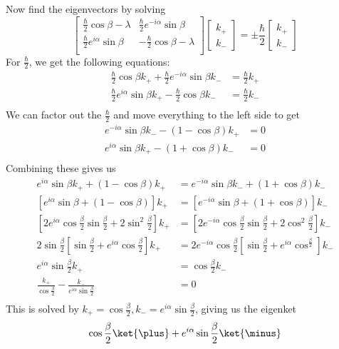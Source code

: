 Now find the eigenvectors by solving
\[
\begin{bmatrix}
  \frac{\hbar}{2}\cos\beta - \lambda & \frac{\hbar}{2}e^{-i\alpha}\sin\beta \\
  \frac{\hbar}{2}e^{i\alpha}\sin\beta & -\frac{\hbar}{2}\cos\beta - \lambda \\
\end{bmatrix}
\begin{bmatrix}
  k_{\plus} \\
  k_{\minus}
\end{bmatrix}
=
\pm\frac{\hbar}{2}
\begin{bmatrix}
  k_{\plus} \\
  k_{\minus}
\end{bmatrix}
\]
For $\frac{\hbar}{2}$, we get the
following equations:
\begin{align*}
  \frac{\hbar}{2}\cos\beta k_{\plus}
  +\frac{\hbar}{2}e^{-i\alpha}\sin\beta k_{\minus} &=
  \frac{\hbar}{2}k_{\plus} \\
  \frac{\hbar}{2}e^{i\alpha}\sin\beta k_{\plus}
  -\frac{\hbar}{2}\cos\beta k_{\minus} &=
  \frac{\hbar}{2}k_{\minus} \\
\end{align*}
We can factor out the $\frac{\hbar}{2}$ and move everything to the
left side to get
\begin{align*}
  e^{-i\alpha}\sin\beta k_{\minus} - (1 - \cos\beta)k_{\plus} &= 0 \\
  e^{i\alpha}\sin\beta k_{\plus} - (1 + \cos\beta)k_{\minus} &= 0 \\
\end{align*}
Combining these gives us
\begin{align*}
  e^{i\alpha}\sin\beta k_{\plus} + (1 - \cos\beta)k_{\plus} &=
  e^{-i\alpha}\sin\beta k_{\minus} + (1 + \cos\beta)k_{\minus} \\
  [e^{i\alpha}\sin\beta + (1 - \cos\beta)]k_{\plus} &=
  [e^{-i\alpha}\sin\beta + (1 + \cos\beta)]k_{\minus} \\
  \left[2e^{i\alpha}\cos\frac{\beta}{2}\sin\frac{\beta}{2} + 2\sin^2\frac{\beta}{2}\right]k_{\plus} &=
  \left[2e^{-i\alpha}\cos\frac{\beta}{2}\sin\frac{\beta}{2} + 2\cos^2\frac{\beta}{2}\right]k_{\minus} \\
  2\sin\frac{\beta}{2}\left[\sin\frac{\beta}{2} + e^{i\alpha}\cos\frac{\beta}{2}\right]k_{\plus} &=
  2e^{-i\alpha}\cos\frac{\beta}{2}\left[\sin\frac{\beta}{2} + e^{i\alpha}\cos^\frac{\beta}{2}\right]k_{\minus} \\
  e^{i\alpha}\sin\frac{\beta}{2}k_{\plus} &= \cos\frac{\beta}{2}k_{\minus} \\
  \frac{k_{\plus}}{\cos\frac{\beta}{2}} - \frac{k_{\minus}}{e^{i\alpha}\sin\frac{\beta}{2}} &= 0 \\
\end{align*}
This is solved by $k_{\plus} = \cos\frac{\beta}{2}, k_{\minus} =
e^{i\alpha}\sin\frac{\beta}{2}$, giving us the eigenket
\[ \cos\frac{\beta}{2}\ket{\plus} + e^{i\alpha}\sin\frac{\beta}{2}\ket{\minus} \]

